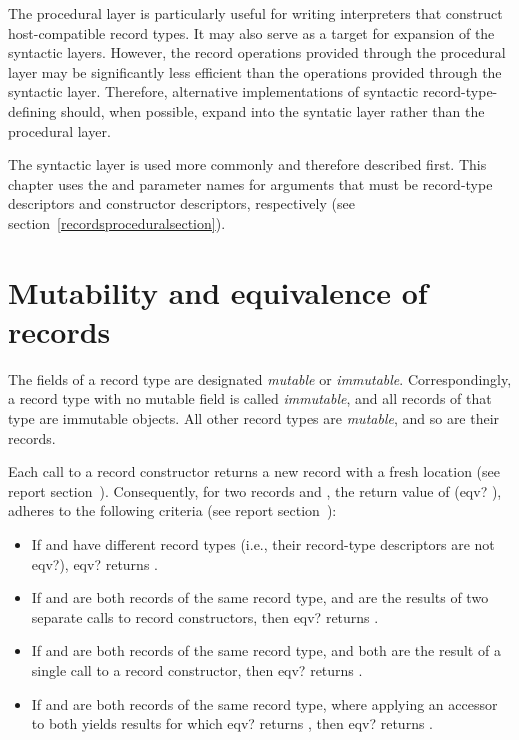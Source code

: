 The procedural layer is particularly useful for writing interpreters
that construct host-compatible record types.  It may also serve as a
target for expansion of the syntactic layers.  However, the
record operations provided through the procedural layer may be
significantly less efficient than the operations provided through the
syntactic layer.  Therefore, alternative implementations
of syntactic record-type-defining should, when possible, expand into
the syntatic layer rather than the procedural layer.

The syntactic layer is used more commonly and therefore described
first.  This chapter uses the  and
 parameter names for arguments that must
be record-type descriptors and constructor descriptors, respectively
(see section~\ref{recordsproceduralsection}).

\section{Mutability and equivalence of records}
\label{recordsequivalencesection}

The fields of a record type are designated \textit{mutable} or
\textit{immutable}.  Correspondingly, a record type with no mutable
field is called \textit{immutable}, and all records of that type
are immutable objects.  All other record types are \textit{mutable},
and so are their records.

Each call to a record constructor returns a new record with a fresh
location (see report section~).  Consequently, for two records  and ,
the return value of {\cf (eqv?  )}, adheres to
the following criteria (see report
section~):

\begin{itemize}
\item If  and  have different record types (i.e.,
  their record-type descriptors are not {\cf eqv?}), {\cf eqv?}
  returns \schfalse.
\item If  and  are both records of the
  same record type, and are the results of two separate calls to
  record constructors, then {\cf eqv?} returns \schfalse.
\item If  and  are both records of the
  same record type, and both are the result of a single call to a
  record constructor, then {\cf eqv?} returns \schtrue.
\item If  and  are both records of the same
  record type, where applying an accessor to both yields results
  for which {\cf eqv?} returns \schfalse, then {\cf eqv?} returns \schfalse.
\end{itemize}

